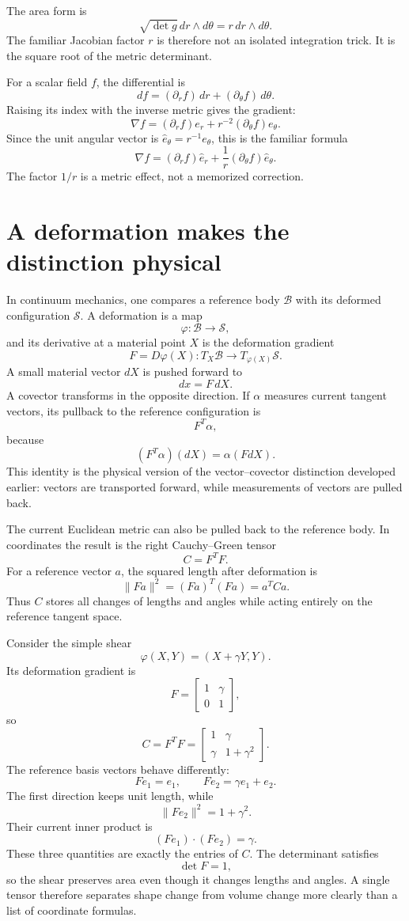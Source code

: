 The area form is
\[
  \sqrt{\det g}\,dr\wedge d\theta
  =r\,dr\wedge d\theta.
\]
The familiar Jacobian factor \(r\) is therefore not an isolated integration trick.  It is the square root of the metric determinant.

For a scalar field \(f\), the differential is
\[
  df=(\partial_rf)\,dr+(\partial_\theta f)\,d\theta.
\]
Raising its index with the inverse metric gives the gradient:
\[
  \nabla f
  =(\partial_rf)e_r+r^{-2}(\partial_\theta f)e_\theta.
\]
Since the unit angular vector is \(\widehat e_\theta=r^{-1}e_\theta\), this is the familiar formula
\[
  \nabla f
  =(\partial_rf)\widehat e_r
  +\frac1r(\partial_\theta f)\widehat e_\theta.
\]
The factor \(1/r\) is a metric effect, not a memorized correction.

\section{A deformation makes the distinction physical}

In continuum mechanics, one compares a reference body \(\mathcal B\) with its deformed configuration \(\mathcal S\).  A deformation is a map
\[
  \varphi:\mathcal B\to\mathcal S,
\]
and its derivative at a material point \(X\) is the deformation gradient
\[
  F=D\varphi(X):T_X\mathcal B\to T_{\varphi(X)}\mathcal S.
\]
A small material vector \(dX\) is pushed forward to
\[
  dx=F\,dX.
\]
A covector transforms in the opposite direction.  If \(\alpha\) measures current tangent vectors, its pullback to the reference configuration is
\[
  F^T\alpha,
\]
because
\[
  (F^T\alpha)(dX)=\alpha(FdX).
\]
This identity is the physical version of the vector--covector distinction developed earlier: vectors are transported forward, while measurements of vectors are pulled back.

The current Euclidean metric can also be pulled back to the reference body.  In coordinates the result is the right Cauchy--Green tensor
\[
  C=F^TF.
\]
For a reference vector \(a\), the squared length after deformation is
\[
  \|Fa\|^2
  =(Fa)^T(Fa)
  =a^TCa.
\]
Thus \(C\) stores all changes of lengths and angles while acting entirely on the reference tangent space.

Consider the simple shear
\[
  \varphi(X,Y)=(X+\gamma Y,Y).
\]
Its deformation gradient is
\[
  F=
  \begin{bmatrix}
    1&\gamma\\
    0&1
  \end{bmatrix},
\]
so
\[
  C=F^TF
  =
  \begin{bmatrix}
    1&\gamma\\
    \gamma&1+\gamma^2
  \end{bmatrix}.
\]
The reference basis vectors behave differently:
\[
  Fe_1=e_1,
  \qquad
  Fe_2=\gamma e_1+e_2.
\]
The first direction keeps unit length, while
\[
  \|Fe_2\|^2=1+\gamma^2.
\]
Their current inner product is
\[
  (Fe_1)\cdot(Fe_2)=\gamma.
\]
These three quantities are exactly the entries of \(C\).  The determinant satisfies
\[
  \det F=1,
\]
so the shear preserves area even though it changes lengths and angles.  A single tensor therefore separates shape change from volume change more clearly than a list of coordinate formulas.

